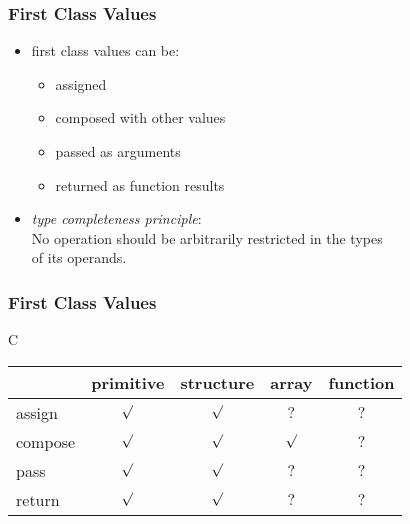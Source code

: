 \documentclass[dvipsnames]{beamer}
\theoremstyle{plain}
\begin{document}
\begin{frame}
  \frametitle{First Class Values}

  \begin{itemize}
    \item \alert{first class values} can be:
    \begin{itemize}
      \item assigned
      \item composed with other values
      \item passed as arguments
      \item returned as function results
    \end{itemize}

    \pause
    \bigskip
    \item \emph{type completeness principle}:\\
      No operation should be arbitrarily restricted in the types\\
      of its operands.
  \end{itemize}
\end{frame}

\begin{frame}
  \frametitle{First Class Values}

  \begin{block}{C}
    \begin{table}
      \begin{tabular}{l||c|c|c|c}
                & primitive & structure &  array  & function\\\hline\hline
        assign  &  $\surd$  &  $\surd$  &   $?$   &    $?$  \\\hline
        compose &  $\surd$  &  $\surd$  & $\surd$ &    $?$  \\\hline
        pass    &  $\surd$  &  $\surd$  &   $?$   &    $?$  \\\hline
        return  &  $\surd$  &  $\surd$  &   $?$   &    $?$
      \end{tabular}
    \end{table}
  \end{block}
\end{frame}
\end{document}
